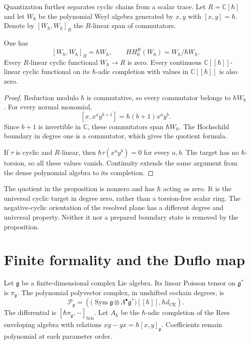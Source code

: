 Quantization further separates cyclic chains from a scalar
trace. Let $R=\mathbb C[\hbar]$ and let $W_\hbar$ be the
polynomial Weyl algebra generated by $x,y$ with
$[x,y]=\hbar$.
Denote by $[W_\hbar,W_\hbar]_R$ the $R$-linear span
of commutators.

\begin{proposition}\label{prop:vol2-weyl-cyclic-quotient}
One has
\[
 [W_\hbar,W_\hbar]_R=\hbar W_\hbar,\qquad
 HH_0^R(W_\hbar)=W_\hbar/\hbar W_\hbar.
\]
Every $R$-linear cyclic functional $W_\hbar\to R$ is zero.
Every continuous $\mathbb C[[\hbar]]$-linear cyclic
functional on its $\hbar$-adic completion with values
in $\mathbb C[[\hbar]]$ is also zero.
\end{proposition}
\begin{proof}
Reduction modulo $\hbar$ is commutative, so every
commutator belongs to $\hbar W_\hbar$.
For every normal monomial,
\[
 [x,x^ay^{b+1}]=\hbar(b+1)x^ay^b.
\]
Since $b+1$ is invertible in $\mathbb C$, these
commutators span $\hbar W_\hbar$.
The Hochschild boundary in degree one is a commutator,
which gives the quotient formula.

If $\tau$ is cyclic and $R$-linear, then
$\hbar\tau(x^ay^b)=0$ for every $a,b$.
The target has no $\hbar$-torsion, so all these values
vanish. Continuity extends the same argument from
the dense polynomial algebra to its completion.
\end{proof}

The quotient in the proposition is nonzero and has
$\hbar$ acting as zero. It is the universal cyclic
target in degree zero, rather than a torsion-free
scalar ring. The negative-cyclic orientation of the
resolved plane has a different degree and universal
property. Neither it nor a prepared boundary state
is removed by the proposition.

\section{Finite formality and the Duflo map}
\label{sec:vol2-finite-duflo}

Let $\mathfrak g$ be a finite-dimensional complex Lie
algebra. Its linear Poisson tensor on $\mathfrak g^*$ is
$\pi_{\mathfrak g}$.
The polynomial polyvector complex, in unshifted
cochain degrees, is
\[
 \mathcal P_{\mathfrak g}
 =
 \left(
   \bigl(\operatorname{Sym}\mathfrak g
          \otimes\Lambda^\bullet\mathfrak g^*\bigr)[[\hbar]],
   \hbar d_{\mathrm{CE}}
 \right).
\]
The differential is
$[\hbar\pi_{\mathfrak g},-]_{\mathrm{Sch}}$.
Let $A_\hbar$ be the $\hbar$-adic completion of the
Rees enveloping algebra with relations
$xy-yx=\hbar[x,y]_{\mathfrak g}$.
Coefficients remain polynomial at each parameter order.

